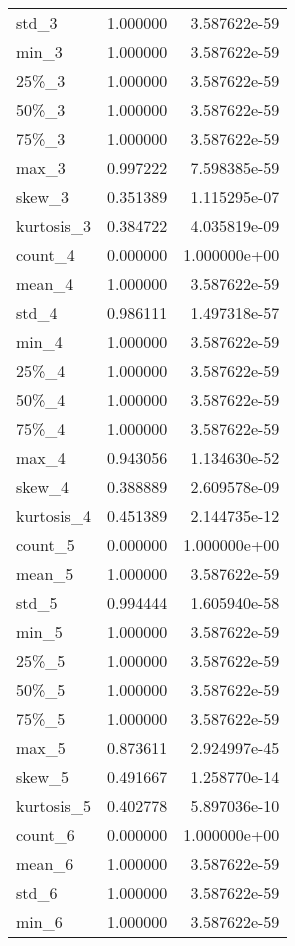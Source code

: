 \begin{center}
\begin{longtable}{lrr}
std\_3      &  1.000000 &  3.587622e-59 \\
min\_3      &  1.000000 &  3.587622e-59 \\
25\%\_3      &  1.000000 &  3.587622e-59 \\
50\%\_3      &  1.000000 &  3.587622e-59 \\
75\%\_3      &  1.000000 &  3.587622e-59 \\
max\_3      &  0.997222 &  7.598385e-59 \\
skew\_3     &  0.351389 &  1.115295e-07 \\
kurtosis\_3 &  0.384722 &  4.035819e-09 \\
count\_4    &  0.000000 &  1.000000e+00 \\
mean\_4     &  1.000000 &  3.587622e-59 \\
std\_4      &  0.986111 &  1.497318e-57 \\
min\_4      &  1.000000 &  3.587622e-59 \\
25\%\_4      &  1.000000 &  3.587622e-59 \\
50\%\_4      &  1.000000 &  3.587622e-59 \\
75\%\_4      &  1.000000 &  3.587622e-59 \\
max\_4      &  0.943056 &  1.134630e-52 \\
skew\_4     &  0.388889 &  2.609578e-09 \\
kurtosis\_4 &  0.451389 &  2.144735e-12 \\
count\_5    &  0.000000 &  1.000000e+00 \\
mean\_5     &  1.000000 &  3.587622e-59 \\
std\_5      &  0.994444 &  1.605940e-58 \\
min\_5      &  1.000000 &  3.587622e-59 \\
25\%\_5      &  1.000000 &  3.587622e-59 \\
50\%\_5      &  1.000000 &  3.587622e-59 \\
75\%\_5      &  1.000000 &  3.587622e-59 \\
max\_5      &  0.873611 &  2.924997e-45 \\
skew\_5     &  0.491667 &  1.258770e-14 \\
kurtosis\_5 &  0.402778 &  5.897036e-10 \\
count\_6    &  0.000000 &  1.000000e+00 \\
mean\_6     &  1.000000 &  3.587622e-59 \\
std\_6      &  1.000000 &  3.587622e-59 \\
min\_6      &  1.000000 &  3.587622e-59 \\

\end{longtable}
\end{center}
